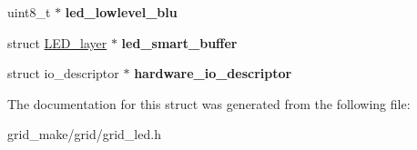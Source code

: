 \begin{DoxyCompactItemize}
\item 
\hypertarget{structgrid__led__model_a9bc514803d1a8806eda085b28bedfe1c}{uint8\-\_\-t $\ast$ {\bfseries led\-\_\-lowlevel\-\_\-blu}}\label{structgrid__led__model_a9bc514803d1a8806eda085b28bedfe1c}

\item 
\hypertarget{structgrid__led__model_abf455283d765da1ce09ab26cc457bc79}{struct \hyperlink{structLED__layer}{L\-E\-D\-\_\-layer} $\ast$ {\bfseries led\-\_\-smart\-\_\-buffer}}\label{structgrid__led__model_abf455283d765da1ce09ab26cc457bc79}

\item 
\hypertarget{structgrid__led__model_acef0c0f40528d205e1abc895f9bcec2d}{struct io\-\_\-descriptor $\ast$ {\bfseries hardware\-\_\-io\-\_\-descriptor}}\label{structgrid__led__model_acef0c0f40528d205e1abc895f9bcec2d}

\end{DoxyCompactItemize}


The documentation for this struct was generated from the following file\-:\begin{DoxyCompactItemize}
\item 
grid\-\_\-make/grid/grid\-\_\-led.\-h\end{DoxyCompactItemize}
